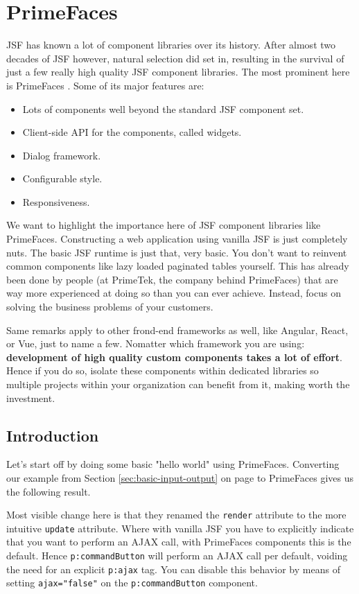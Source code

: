 %

\chapter{PrimeFaces}
\label{chap:primefaces}
JSF has known a lot of component libraries over its history.
After almost two decades of JSF however, natural selection did set in,
resulting in the survival of just a few really high quality JSF component libraries.
The most prominent here is PrimeFaces \cite{PrimeFaces}.
Some of its major features are:
\begin{itemize}
	\item Lots of components well beyond the standard JSF component set.
	\item Client-side API for the components, called widgets.
	\item Dialog framework.
	\item Configurable style.
	\item Responsiveness.
\end{itemize}
We want to highlight the importance here of JSF component libraries like PrimeFaces.
Constructing a web application using vanilla JSF is just completely nuts.
The basic JSF runtime is just that, very basic.
You don't want to reinvent common components like lazy loaded paginated tables yourself.
This has already been done by people (at PrimeTek, the company behind PrimeFaces) that are way more experienced at doing so than you can ever achieve.
Instead, focus on solving the business problems of your customers.

Same remarks apply to other frond-end frameworks as well, like Angular, React, or Vue, just to name a few.
Nomatter which framework you are using: \textbf{development of high quality custom components takes a lot of effort}.
Hence if you do so, isolate these components within dedicated libraries so multiple projects within your organization can benefit from it, making worth the investment.


\section{Introduction}
Let's start off by doing some basic "hello world" using PrimeFaces.
Converting our  example from Section \ref{sec:basic-input-output}  on page \pageref{sec:basic-input-output} to PrimeFaces gives us the following result.

Most visible change here is that they renamed the \texttt{render} attribute to the more intuitive \texttt{update} attribute.
Where with vanilla JSF you have to explicitly indicate that you want to perform an AJAX call, with PrimeFaces components this is the default.
Hence \texttt{p:commandButton} will perform an AJAX call per default, voiding the need for an explicit \texttt{p:ajax} tag.
You can disable this behavior by means of setting \texttt{ajax="false"} on the \texttt{p:commandButton} component.

